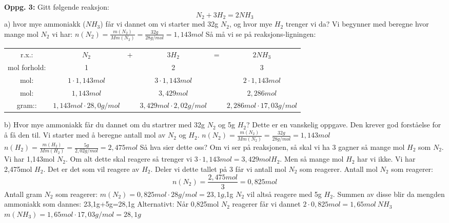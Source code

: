 \documentclass[12pt,a4paper]{article}
\begin{document}
\noindent\textbf{Oppg. 3:}\nl
Gitt følgende reaksjon:
$$N_2+3H_2=2NH_3$$
a) hvor mye ammoniakk ($NH_3$) får vi dannet om vi starter med 32g $N_2$, og hvor mye $H_2$ trenger vi da?\nl
Vi begynner med  beregne hvor mange mol $N_2$ vi har:\nl
$n(N_2)=\frac{m(N_2)}{Mm(N_2)}=\frac{32g}{28g/mol}=1,143mol$
\newpage
Så må vi se på reaksjons-ligningen:
\begin{table}[H]
    \centering
    \begin{tabular}{cccccc}
         r.x.:& $N_2$&+ &$3H_2$&= & $2NH_3$\\
              mol forhold:&1 & &2 & &3 \\
              mol:&$1\cdot 1,143mol$ & &$3\cdot 1,143mol$ & &$2\cdot 1,143mol$ \\
              mol:&$1,143mol$ & &$3,429mol$ & &$2,286mol$ \\
              gram::&$1,143mol\cdot 28,0g/mol$ & &$3,429mol\cdot 2,02g/mol$ & &$2,286mol\cdot 17,03g/mol$ \\
    \end{tabular}
\end{table}\nl
b) Hvor mye ammoniakk får du dannet om du startrer med 32g $N_2$ og 5g $H_2$?\nl
Dette er en vanskelig oppgave. Den krever god forståelse for å få den til.  Vi starter med å beregne antall mol av $N_2$ og $H_2$.\nl
$n(N_2)=\frac{m(N_2)}{Mm(N_2)}=\frac{32g}{28g/mol}=1,143mol$\nl
$n(H_2)=\frac{m(H_2)}{Mm(H_2)}=\frac{5g}{2,02g/mol}=2,475mol$\nl
Så hva sier dette oss? Om vi ser på reaksjonen, så skal vi ha 3 gagner så mange mol $H_2$ som $N_2$.  Vi har 1,143mol $N_2$. Om  alt dette skal reagere så trenger vi $3\cdot 1,143mol=3,429mol H_2$.  Men så mange mol $H_2$ har vi ikke. Vi har 2,475mol $H_2$.  Det er det som vil reagere av $H_2$.  Deler vi dette tallet på 3 får vi antall mol $N_2$ som reagerer.\nl
Antall mol $N_2$ som reagerer:\nl
$$n(N_2)=\frac{2,475mol}{3}=0,825mol$$\nl
Antall gram $N_2$ som reagerer:\nl
$m(N_2)=0,825mol\cdot 28g/mol=23,1g$,1g $N_2$ vil altså reagere med 5g $H_2$.  Summen av disse blir da mengden ammoniakk som dannes:  23,1g+5g=28,1g\newpage
Alternativt:\nl
Når 0,825mol $N_2$ reagerer får vi dannet $2\cdot 0,825mol=1,65mol \ NH_3$\nl
$m(NH_3)=1,65mol\cdot 17,03g/mol=28,1g$
\end{document}

